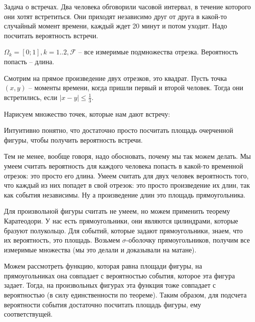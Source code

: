 \begin{exmp}
Задача о встречах. Два человека обговорили часовой интервал, в течение которого они хотят встретиться. 
Они приходят независимо друг от друга в какой-то случайный момент времени, каждый ждет 20 минут и потом уходит.
Надо посчитать вероятность встречи.

$\Omega_k = [0; 1], k = 1..2, \mathcal{F}$ -- все измеримые подмножества отрезка. Вероятность попасть -- длина.

Смотрим на прямое произведение двух отрезков, это квадрат.
Пусть точка $(x, y)$ -- моменты времени, когда пришли первый и второй человек. 
Тогда они встретились, если $|x - y| \leq \frac13$. 

Нарисуем множество точек, которые нам дают встречу:


Интуитивно понятно, что достаточно просто посчитать площадь очерченной фигуры, чтобы получить вероятность встречи.

Тем не менее, вообще говоря, надо обосновать, почему мы так можем делать. 
Мы умеем считать вероятность для каждого человека попасть в какой-то временной отрезок: это просто его длина.
Умеем считать для двух человек вероятность того, что каждый из них попадет в свой отрезок: это просто произведение их длин, так как события независимы.
Ну а произведение длин это площадь прямоугольника.

Для произвольной фигуры считать не умеем, но можем применить теорему Каратеодори. У нас есть прямоугольники, они являются цилиндрами, которые бразуют полукольцо.
Для событий, которые задают прямоугольники, знаем, что их вероятность, это площадь. Возьмем $\sigma$-оболочку прямоугольников, получим все измеримые множества (мы это делали и доказывали на матане).

Можем рассмотреть функцию, которая равна площади фигуры, на прямоугольниках она совпадает с вероятностью события, которое эта фигура задает.
Тогда, на произвольных фигурах эта функция тоже совпадает с вероятностью (в силу единственности по теореме).
Таким образом, для подсчета вероятности события достаточно посчитать площадь фигуры, ему соответствущей.
\end{exmp}

